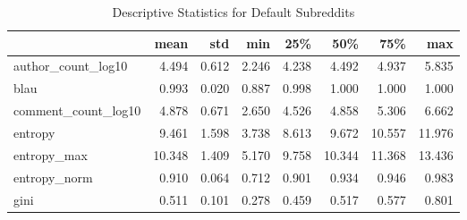 \begin{table}
\centering
\begin{tabular}{lrrrrrrr}
\toprule
{} &   mean &   std &   min &   25\% &    50\% &    75\% &    max \\
\midrule
author\_count\_log10  &  4.494 & 0.612 & 2.246 & 4.238 &  4.492 &  4.937 &  5.835 \\
blau                &  0.993 & 0.020 & 0.887 & 0.998 &  1.000 &  1.000 &  1.000 \\
comment\_count\_log10 &  4.878 & 0.671 & 2.650 & 4.526 &  4.858 &  5.306 &  6.662 \\
entropy             &  9.461 & 1.598 & 3.738 & 8.613 &  9.672 & 10.557 & 11.976 \\
entropy\_max         & 10.348 & 1.409 & 5.170 & 9.758 & 10.344 & 11.368 & 13.436 \\
entropy\_norm        &  0.910 & 0.064 & 0.712 & 0.901 &  0.934 &  0.946 &  0.983 \\
gini                &  0.511 & 0.101 & 0.278 & 0.459 &  0.517 &  0.577 &  0.801 \\
\bottomrule
\end{tabular}
\caption{Descriptive Statistics for Default Subreddits}
\label{table/defaults}
\end{table}